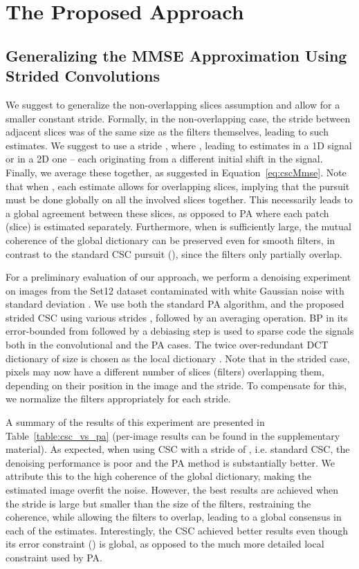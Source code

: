 \documentclass{article}
\begin{document}
\section{The Proposed Approach}
\subsection{Generalizing the MMSE Approximation Using Strided Convolutions}
\label{sec:strided_csc}
We suggest to generalize the non-overlapping slices assumption and allow for a smaller constant stride. Formally, in the non-overlapping case, the stride between adjacent slices was of the same size as the filters themselves, leading to  such estimates. We suggest to use a stride , where , leading to  estimates in a 1D signal or  in a 2D one -- each originating from a different initial shift in the signal. Finally, we average these together, as suggested in Equation~\eqref{eq:cscMmse}. Note that when , each estimate allows for overlapping slices, implying that the pursuit must be done globally on all the involved slices together. This necessarily leads to a global agreement between these slices, as opposed to PA where each patch (slice) is estimated separately. Furthermore, when  is sufficiently large, the mutual coherence of the global dictionary can be preserved even for smooth filters, in contrast to the standard CSC pursuit (), since the filters only partially overlap.

For a preliminary evaluation of our approach, we perform a denoising experiment on images from the Set12 dataset contaminated with white Gaussian noise with standard deviation . We use both the standard PA algorithm, and the proposed strided CSC using various strides , followed by an averaging operation. BP in its error-bounded from followed by a debiasing step is used to sparse code the signals both in the convolutional and the PA cases. The twice over-redundant DCT dictionary of size  is chosen as the local dictionary . Note that in the strided case, pixels may now have a different number of slices (filters) overlapping them, depending on their position in the image and the stride. To compensate for this, we normalize the filters appropriately for each stride.

A summary of the results of this experiment are presented in Table~\ref{table:csc_vs_pa} (per-image results can be found in the supplementary material). As expected, when using CSC with a stride of , i.e. standard CSC, the denoising performance is poor and the PA method is substantially better. We attribute this to the high coherence of the global dictionary, making the estimated image overfit the noise. However, the best results are achieved when the stride is large but smaller than the size of the filters, restraining the coherence, while allowing the filters to overlap, leading to a global consensus in each of the estimates. Interestingly, the CSC achieved better results even though its error constraint () is global, as opposed to the much more detailed local constraint used by PA.
\end{document}
